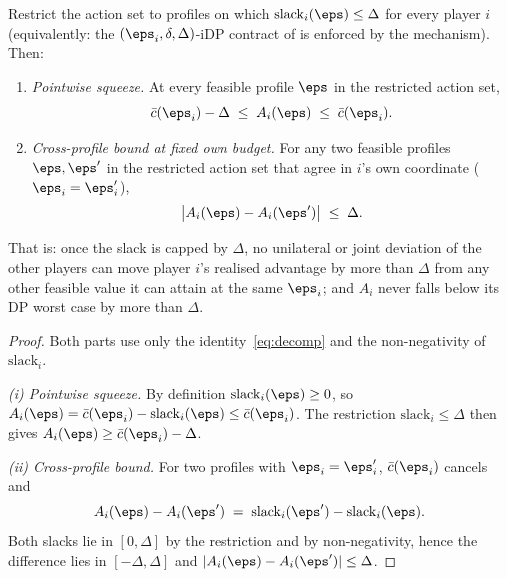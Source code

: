 \begin{proposition}
\label{prop:delta-neutralisation}
Restrict the action set to profiles on which
$\mathrm{slack}_i(\boldsymbol{\eps})\leq\Delta$ for every player $i$
(equivalently: the $(\eps_i,\delta,\Delta)$-iDP contract of
\citet{kaissis2024beyond} is enforced by the mechanism). Then:
\begin{enumerate}
\item[(i)] \emph{Pointwise squeeze.} At every feasible profile
$\boldsymbol{\eps}$ in the restricted action set,
\[
\bar c(\eps_i)-\Delta
\;\leq\;A_i(\boldsymbol{\eps})
\;\leq\;\bar c(\eps_i).
\]
\item[(ii)] \emph{Cross-profile bound at fixed own budget.} For any two
feasible profiles $\boldsymbol{\eps},\boldsymbol{\eps}'$ in the
restricted action set that agree in $i$'s own coordinate ($\eps_i =
\eps_i'$),
\[
\bigl|A_i(\boldsymbol{\eps})-A_i(\boldsymbol{\eps}')\bigr|\;\leq\;\Delta.
\]
\end{enumerate}
That is: once the slack is capped by $\Delta$, no unilateral or joint
deviation of the other players can move player $i$'s realised advantage
by more than $\Delta$ from any other feasible value it can attain at the
same $\eps_i$; and $A_i$ never falls below its DP worst case by more
than $\Delta$.
\end{proposition}

\begin{proof}
Both parts use only the identity~\eqref{eq:decomp} and the
non-negativity of $\mathrm{slack}_i$.

\emph{(i) Pointwise squeeze.} By definition
$\mathrm{slack}_i(\boldsymbol{\eps})\geq 0$, so
$A_i(\boldsymbol{\eps}) = \bar c(\eps_i) -
\mathrm{slack}_i(\boldsymbol{\eps}) \leq \bar c(\eps_i)$. The
restriction $\mathrm{slack}_i\leq\Delta$ then gives
$A_i(\boldsymbol{\eps}) \geq \bar c(\eps_i) - \Delta$.

\emph{(ii) Cross-profile bound.} For two profiles with
$\eps_i = \eps_i'$, $\bar c(\eps_i)$ cancels and
\[
A_i(\boldsymbol{\eps}) - A_i(\boldsymbol{\eps}')
\;=\;\mathrm{slack}_i(\boldsymbol{\eps}')-\mathrm{slack}_i(\boldsymbol{\eps}).
\]
Both slacks lie in $[0,\Delta]$ by the restriction and by non-negativity,
hence the difference lies in $[-\Delta,\Delta]$ and
$|A_i(\boldsymbol{\eps}) - A_i(\boldsymbol{\eps}')|\leq\Delta$.
\end{proof}

